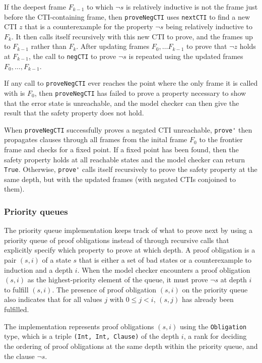 \documentclass[12pt,a4paper,twoside,openright]{report}
\begin{document}
{If the deepest frame $F_{k - 1}$ to which $\neg s$ is relatively inductive is not the frame just before
the CTI-containing frame, then \verb,proveNegCTI, uses \verb,nextCTI, to find a new CTI $z$
that is a counterexample for the property $\neg s$ being relatively inductive to $F_k$. It then
calls itself recursively with this new CTI to prove, and the frames up to $F_{k - 1}$ rather than
$F_k$. After updating frames $F_0, \ldots F_{k - 1}$ to prove that $\neg z$ holds at $F_{k - 1}$,
the call to \verb,negCTI, to prove $\neg s$ is repeated using the updated frames $F_0, \ldots, F_{k - 1}$.

If any call to \verb,proveNegCTI, ever reaches the point where the only frame it is called with is
$F_0$, then \verb,proveNegCTI, has failed to prove a property necessary to show that the error
state is unreachable, and the model checker can then give the result that the safety property
does not hold.

When \verb,proveNegCTI, successfully proves a negated CTI unreachable, \verb,prove', then propagates
clauses through all frames from the inital frame $F_0$ to the frontier frame and checks for a fixed
point. If a fixed point has been found, then the safety property holds at all reachable states and the
model checker can return \verb,True,. Otherwise, \verb,prove', calls itself recursively to prove
the safety property at the same depth, but with the updated frames (with negated CTIs conjoined
to them).

\subsubsection{Priority queues}

The priority queue implementation keeps track of what to prove next by using a priority queue of proof
obligations instead of through recursive calls that explicitly specify which property to prove at
which depth. A proof obligation is a pair $(s,i)$ of a state $s$ that is either a set of bad states
or a counterexample to induction and a depth $i$. When the model checker encounters a proof obligation
$(s,i)$ as the highest-priority element of the queue, it must prove $\neg s$ at depth $i$ to fulfill
$(s, i)$.
The presence of proof obligation $(s,i)$ on the priority queue also indicates that for all values $j$
with $0 \leq j < i$, $(s, j)$ has already been fulfilled.

The implementation represents proof obligations $(s,i)$ using the \verb,Obligation, type, which
is a triple \verb.(Int, Int, Clause). of the depth $i$, a rank for deciding the ordering of
proof obligations at the same depth within the priority queue, and the clause $\neg s$.

}
\end{document}
